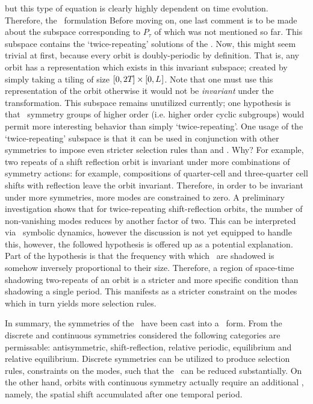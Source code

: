 but this type of equation is clearly highly dependent on time evolution. Therefore, the \spt\ formulation
Before moving on, one last comment is to be made about the subspace corresponding to $P_{\tau}$ of  which was not mentioned so far.
This subspace contains the `twice-repeating' solutions of the \KSe.
Now, this might seem trivial at first, because every orbit is doubly-periodic by definition.
That is, any orbit has a representation which exists in this invariant subspace; created by simply taking
a tiling of size $[0, 2{T_{}}] \times [0, {L_{}}]$. Note that one must use this representation of the orbit otherwise
it would not be \textit{invariant} under the transformation. This subspace remains unutilized
currently; one hypothesis is that \spt\ symmetry groups of higher order (i.e. higher order cyclic subgroups) would permit
more interesting behavior than simply `twice-repeating'. One usage of the `twice-repeating' subspace is that it can
be used in conjunction with other symmetries to impose even stricter selection rules than  and .
Why? For example, two repeats of a shift reflection orbit is invariant under more combinations of symmetry actions: for example,
compositions of quarter-cell and three-quarter cell shifts with reflection leave the orbit invariant. Therefore, in order
to be invariant under more symmetries, more modes are constrained to zero. A preliminary investigation shows that
for twice-repeating shift-reflection orbits, the number of non-vanishing modes reduces by another factor of two. This
can be interpreted via \spt\ symbolic dynamics, however the discussion is not yet equipped to handle this, however, the
followed hypothesis is offered up as a potential explanation.
Part of the hypothesis is that the frequency with which \twots\ are shadowed is somehow inversely proportional to their size.
Therefore, a region of space-time shadowing two-repeats of an orbit is a stricter and more specific condition
than shadowing a single period. This manifests as a stricter constraint on the modes which in turn yields more selection rules.

In summary, the symmetries of the \KSe\ have been cast into a \spt\ form. From the discrete and continuous symmetries considered the following
categories are permissable: antisymmetric, shift-reflection, relative periodic, equilibrium and relative equilibrium. Discrete symmetries
can be utilized to produce selection rules, constraints on the modes, such that the \cdof\ can be reduced substantially. On the other hand,
orbits with continuous symmetry actually require an additional \cdof, namely, the spatial shift accumulated after one temporal period.

